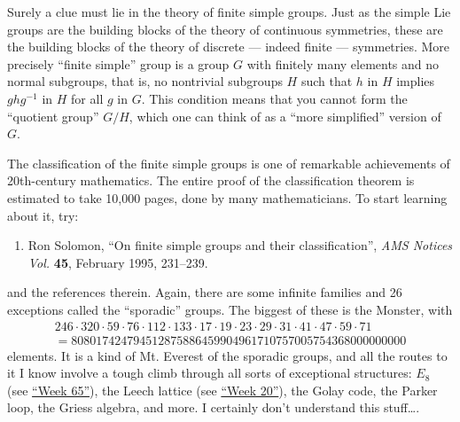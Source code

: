 \documentclass{article}
\def\tightlist{}
\begin{document}
Surely a clue must lie in the theory of finite simple groups. Just as
the simple Lie groups are the building blocks of the theory of
continuous symmetries, these are the building blocks of the theory of
discrete --- indeed finite --- symmetries. More precisely ``finite
simple'' group is a group \(G\) with finitely many elements and no
normal subgroups, that is, no nontrivial subgroups \(H\) such that \(h\)
in \(H\) implies \(ghg^{-1}\) in \(H\) for all \(g\) in \(G\). This
condition means that you cannot form the ``quotient group'' \(G/H\),
which one can think of as a ``more simplified'' version of \(G\).

The classification of the finite simple groups is one of remarkable
achievements of 20th-century mathematics. The entire proof of the
classification theorem is estimated to take 10,000 pages, done by many
mathematicians. To start learning about it, try:

\begin{enumerate}
\def\labelenumi{\arabic{enumi})}
\setcounter{enumi}{3}
\tightlist
\item
  Ron Solomon, ``On finite simple groups and their classification'',
  \emph{AMS Notices Vol.} \textbf{45}, February 1995, 231--239.
\end{enumerate}

and the references therein. Again, there are some infinite families and
26 exceptions called the ``sporadic'' groups. The biggest of these is
the Monster, with \[
  \begin{gathered}
    246\cdot 320\cdot 59\cdot 76\cdot 112\cdot 133\cdot 17\cdot 19\cdot 23\cdot 29\cdot 31\cdot 41\cdot 47\cdot 59\cdot 71
    \\= 808017424794512875886459904961710757005754368000000000
  \end{gathered}
\] elements. It is a kind of Mt. Everest of the sporadic groups, and all
the routes to it I know involve a tough climb through all sorts of
exceptional structures: \(E_8\) (see \protect\hyperlink{week65}{``Week
65''}), the Leech lattice (see \protect\hyperlink{week20}{``Week 20''}),
the Golay code, the Parker loop, the Griess algebra, and more. I
certainly don't understand this stuff\ldots.
\end{document}

